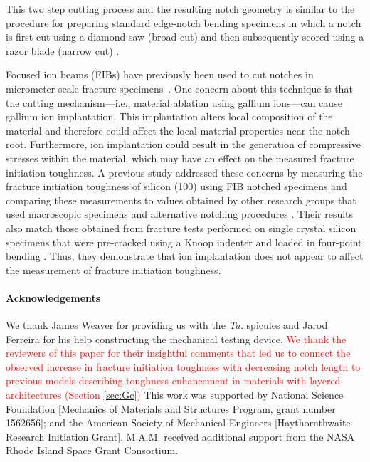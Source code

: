\documentclass[12pt,onecolumn]{article}
\makeatletter
\newcommand{\TA}{\textit{Ta.\@}\xspace}
\makeatother
\begin{document}
\begin{bibunit}
This two step cutting process and the resulting notch geometry is similar to the procedure for preparing standard edge-notch bending specimens in which a notch is first cut using a diamond saw (broad cut) and then subsequently scored using a razor blade (narrow cut) \cite{rocha2006effect,kubler1997fracture,damani1996critical}.

Focused ion beams (FIBs) have previously been used to cut notches in micrometer-scale fracture specimens~\cite{jaya2015can,fett2008fracture,ochiai2014fracture,morishita2006fracture}.  One concern about this technique is that the cutting mechanism---i.e., material ablation using gallium ions---can cause gallium ion implantation. This implantation alters local composition of the material and therefore could affect the local material properties near the notch root. Furthermore, ion implantation could result in the generation of compressive stresses within the material, which may have an effect on the measured fracture initiation toughness. A previous study \cite{jaya2015can} addressed these concerns by measuring the fracture initiation toughness of silicon (100) using FIB notched specimens and comparing these measurements to values obtained by other research groups that used macroscopic specimens and alternative notching procedures \cite{ritchie2003failure}. Their results also match those obtained from fracture tests performed on single crystal silicon specimens that were pre-cracked using a Knoop indenter and loaded in four-point bending \cite{chen1980fracture}. Thus, they demonstrate that ion implantation does not appear to affect the measurement of fracture initiation toughness.

\singlespacing

\paragraph{Acknowledgements} %

We thank James Weaver for providing us with the \TA spicules and Jarod Ferreira for his help constructing the mechanical testing device. \textcolor{red}{We thank the reviewers of this paper for their insightful comments that led us to connect the observed increase in fracture initiation toughness with decreasing notch length to previous models describing toughness enhancement in materials with layered architectures (Section \ref{sec:Gc})} This work was supported by National Science Foundation [Mechanics of Materials and Structures Program, grant number 1562656]; and the American Society of Mechanical Engineers [Haythornthwaite Research Initiation Grant]. M.A.M. received additional support from the NASA Rhode Island Space Grant Consortium.


\end{bibunit}
\end{document}
